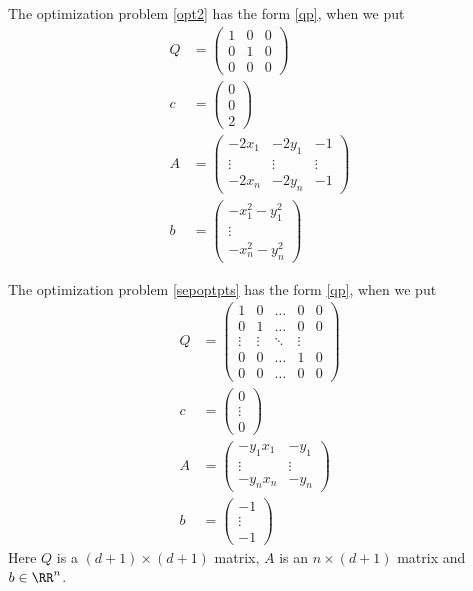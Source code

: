 \documentclass{article}
\begin{document}
\begin{example}
  The optimization problem \eqref{opt2} has the form \eqref{qp}, when we put
  \begin{align*}
    Q &=
        \begin{pmatrix}
          1 & 0 & 0\\
          0 & 1 & 0\\
          0 & 0 & 0
        \end{pmatrix}\\
    c &= \begin{pmatrix}
      0 \\ 0 \\ 2
    \end{pmatrix}\\
    A &=
        \begin{pmatrix}
          -2x_1 & -2y_1 & -1\\
          \vdots & \vdots & \vdots \\
          -2x_n & -2y_n & -1
        \end{pmatrix}\\
    b &= \begin{pmatrix}
      -x_1^2 - y_1^2\\
      \vdots \\
      -x_n^2 - y_n^2
      \end{pmatrix}
  \end{align*}
\end{example}

\begin{example}
  The optimization problem \eqref{sepoptpts} has the form \eqref{qp}, when we put
  \begin{align*}
    Q &=
        \begin{pmatrix}
          1 & 0 & \dots & 0 & 0\\
          0 & 1 & \dots & 0 & 0\\
          \vdots & \vdots &\ddots & \vdots\\
          0 & 0 & \dots & 1 & 0\\
          0 & 0 & \dots & 0 & 0
        \end{pmatrix}\\
    c &= \begin{pmatrix}
      0 \\ \vdots \\ 0
    \end{pmatrix}\\
    A &=
        \begin{pmatrix}
          -y_1 x_1 & -y_1\\
          \vdots & \vdots\\
          - y_n x_n & -y_n
        \end{pmatrix}\\
    b &= \begin{pmatrix}
      -1\\
      \vdots \\
      -1
      \end{pmatrix}
  \end{align*}
  Here $Q$ is a $(d+1)\times (d+1)$ matrix, $A$ is an $n\times (d+1)$ matrix and
  $b\in \RR^n$. 
\end{example}
\end{document}

